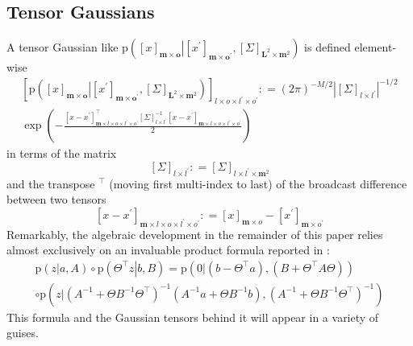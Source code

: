 \documentclass[preprint,12pt]{elsarticle}
\newcommand*{\M}[1]{\ensuremath{#1}\xspace}
\newcommand*{\tr}[1]{\M{#1}}
\newcommand*{\x}{\times}
\newcommand*{\mi}[1]{\mathbf{#1}}
\newcommand*{\te}[2][]{\left\lbrack{#2}\right\rbrack_{#1}}
\newcommand*{\prob}[3]{\M{\mathrm{p}\!\left(\left.{#1}\right\vert{#2,#3}\right)}}
\newcommand*{\deq}{\M{\mathrel{\mathop:}=}}
\newcommand*{\modulus}[1]{\M{\left\lvert{#1}\right\rvert}}
\begin{document}
    \subsection{Tensor Gaussians} \label{sub:GPR:Tensor}
        A tensor Gaussian like $\prob{\te[\mi{m}\x\mi{o}]{x}}{\te[\mi{m}\x\mi{o^{\prime}}]{x^{\prime}}}
        {\te[\mi{L}^{2}\x\mi{m}^{2}]{\Sigma}}$ is defined element-wise
        \begin{multline} \label{def:Notation:p}
            \te[l\x o \x l^{\prime}\x o^{\prime}]{\prob{\te[\mi{m}\x\mi{o}]{x}}{\te[\mi{m}\x\mi{o^{\prime}}]{x^{\prime}}}
            {\te[\mi{L}^{2}\x\mi{m}^{2}]{\Sigma}}}
            \deq (2 \pi)^{-M/2} \modulus{\te[l\x l^{\prime}]{\Sigma}}^{-1/2} \\
            \exp\left(-\frac{
                \te[\mi{m}\x l\x o\x l^{\prime}\x o^{\prime}]{x-x^{\prime}}^{\intercal} 
            \te[l\x l^{\prime}]{\Sigma}^{-1} 
            \te[\mi{m}\x l\x o\x l^{\prime}\x o^{\prime}]{x-x^{\prime}}}
            {2}\right)
        \end{multline}
        in terms of the matrix
        \begin{equation*}
            \te[l\x l^{\prime}]{\Sigma} \deq
            \te[l\x l^{\prime}\x\mi{m}^{2}]{\Sigma}
        \end{equation*}
        and the transpose $^{\intercal}$ (moving first multi-index to last) of the broadcast difference between two tensors
        \begin{equation*}
            \te[\mi{m}\x l\x o\x l^{\prime}\x o^{\prime}]{x-x^{\prime}} \deq
            \te[\mi{m}\x o]{x}
            - \te[\mi{m}\x o^{\prime}]{x^{\prime}}
        \end{equation*}
        Remarkably, the algebraic development in the remainder of this paper relies almost exclusively on an invaluable product formula reported in \cite{Rasmussen2016}:
        \begin{multline} \label{eq:GPR:product}
            \prob{z}{a}{A} \circ \prob{\Theta^{\intercal}z}{\tr{b}}{\tr{B}}
            = \prob{0}{(b-\Theta^{\intercal}a)}{(B + \Theta^{\intercal}A\Theta)} \\
            \circ \prob{z}
            {(A^{-1}+\Theta B^{-1}\Theta^{\intercal})^{-1}(A^{-1}a+\Theta B^{-1}b)}
            {(A^{-1}+\Theta B^{-1}\Theta^{\intercal})^{-1}}
        \end{multline}
        This formula and the Gaussian tensors behind it will appear in a variety of guises.
\end{document}
